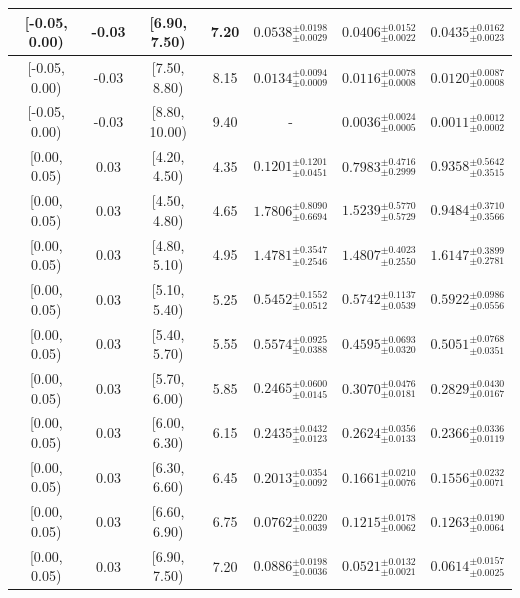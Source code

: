 \begin{longtable}{|c|c|c|c|c|c|c|}
\hline
[-0.05, 0.00) & -0.03 & [6.90, 7.50) & 7.20 & $0.0538^{ \pm 0.0198 }_{ \pm 0.0029 }$ & $0.0406^{ \pm 0.0152 }_{ \pm 0.0022 }$ & $0.0435^{ \pm 0.0162 }_{ \pm 0.0023 }$ \\ 
\hline
[-0.05, 0.00) & -0.03 & [7.50, 8.80) & 8.15 & $0.0134^{ \pm 0.0094 }_{ \pm 0.0009 }$ & $0.0116^{ \pm 0.0078 }_{ \pm 0.0008 }$ & $0.0120^{ \pm 0.0087 }_{ \pm 0.0008 }$ \\ 
\hline
[-0.05, 0.00) & -0.03 & [8.80, 10.00) & 9.40 & - & $0.0036^{ \pm 0.0024 }_{ \pm 0.0005 }$ & $0.0011^{ \pm 0.0012 }_{ \pm 0.0002 }$ \\ 
\hline
[0.00, 0.05) & 0.03 & [4.20, 4.50) & 4.35 & $0.1201^{ \pm 0.1201 }_{ \pm 0.0451 }$ & $0.7983^{ \pm 0.4716 }_{ \pm 0.2999 }$ & $0.9358^{ \pm 0.5642 }_{ \pm 0.3515 }$ \\ 
\hline
[0.00, 0.05) & 0.03 & [4.50, 4.80) & 4.65 & $1.7806^{ \pm 0.8090 }_{ \pm 0.6694 }$ & $1.5239^{ \pm 0.5770 }_{ \pm 0.5729 }$ & $0.9484^{ \pm 0.3710 }_{ \pm 0.3566 }$ \\ 
\hline
[0.00, 0.05) & 0.03 & [4.80, 5.10) & 4.95 & $1.4781^{ \pm 0.3547 }_{ \pm 0.2546 }$ & $1.4807^{ \pm 0.4023 }_{ \pm 0.2550 }$ & $1.6147^{ \pm 0.3899 }_{ \pm 0.2781 }$ \\ 
\hline
[0.00, 0.05) & 0.03 & [5.10, 5.40) & 5.25 & $0.5452^{ \pm 0.1552 }_{ \pm 0.0512 }$ & $0.5742^{ \pm 0.1137 }_{ \pm 0.0539 }$ & $0.5922^{ \pm 0.0986 }_{ \pm 0.0556 }$ \\ 
\hline
[0.00, 0.05) & 0.03 & [5.40, 5.70) & 5.55 & $0.5574^{ \pm 0.0925 }_{ \pm 0.0388 }$ & $0.4595^{ \pm 0.0693 }_{ \pm 0.0320 }$ & $0.5051^{ \pm 0.0768 }_{ \pm 0.0351 }$ \\ 
\hline
[0.00, 0.05) & 0.03 & [5.70, 6.00) & 5.85 & $0.2465^{ \pm 0.0600 }_{ \pm 0.0145 }$ & $0.3070^{ \pm 0.0476 }_{ \pm 0.0181 }$ & $0.2829^{ \pm 0.0430 }_{ \pm 0.0167 }$ \\ 
\hline
[0.00, 0.05) & 0.03 & [6.00, 6.30) & 6.15 & $0.2435^{ \pm 0.0432 }_{ \pm 0.0123 }$ & $0.2624^{ \pm 0.0356 }_{ \pm 0.0133 }$ & $0.2366^{ \pm 0.0336 }_{ \pm 0.0119 }$ \\ 
\hline
[0.00, 0.05) & 0.03 & [6.30, 6.60) & 6.45 & $0.2013^{ \pm 0.0354 }_{ \pm 0.0092 }$ & $0.1661^{ \pm 0.0210 }_{ \pm 0.0076 }$ & $0.1556^{ \pm 0.0232 }_{ \pm 0.0071 }$ \\ 
\hline
[0.00, 0.05) & 0.03 & [6.60, 6.90) & 6.75 & $0.0762^{ \pm 0.0220 }_{ \pm 0.0039 }$ & $0.1215^{ \pm 0.0178 }_{ \pm 0.0062 }$ & $0.1263^{ \pm 0.0190 }_{ \pm 0.0064 }$ \\ 
\hline
[0.00, 0.05) & 0.03 & [6.90, 7.50) & 7.20 & $0.0886^{ \pm 0.0198 }_{ \pm 0.0036 }$ & $0.0521^{ \pm 0.0132 }_{ \pm 0.0021 }$ & $0.0614^{ \pm 0.0157 }_{ \pm 0.0025 }$ \\ 

\end{longtable}
